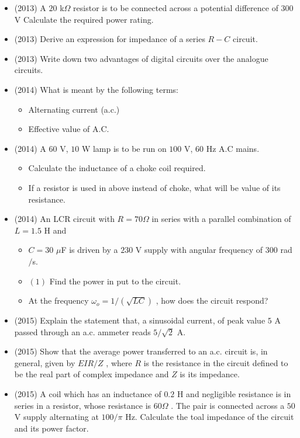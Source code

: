 \documentclass{article}
\begin{document}
\begin{itemize}
\item (2013)  A $ 20$ k$ \Omega$ resistor is to be connected across a potential difference of $ 300$ V Calculate the required power rating.
\item (2013)  Derive an expression for impedance of a series $ R-C$ circuit. 
\item (2013)  Write down two advantages of digital circuits over the analogue circuits.
\item (2014)  What is meant by the following terms:\begin{itemize}
\item Alternating current (a.c.)
\item Effective value of A.C. 
\end{itemize}
\item (2014)  A $ 60$ V, $ 10$ W lamp is to be run on $ 100$ V, $ 60$ Hz A.C mains.\begin{itemize}
\item Calculate the inductance of a choke coil required.
\item If a resistor is used in above instead of choke, what will be value of its resistance.
\end{itemize}
\item (2014)  An LCR circuit with $ R=70\Omega$ in series with a parallel combination of $ L=1.5$ H and\begin{itemize}
\item $ C=30$ $\mu$F is driven by a $ 230$ V supply with angular frequency of $ 300$ rad$/$s.
\item $ (1)$ Find the power in put to the circuit. 
\item  At the frequency $ \omega_{o}=1/(\sqrt{LC})$ , how does the circuit respond?
\end{itemize}
\item (2015)  Explain the statement that, a sinusoidal current, of peak value $ 5$ A passed through an a.c. ammeter reads $ 5/\sqrt{2}$ A.  
\item (2015)  Show that the average power transferred to an a.c. circuit is, in general, given by $ EIR/Z$ , where $ R$ is the resistance in the circuit defined to be the real part of complex impedance and $ Z$ is its impedance.
\item (2015)  A coil which has an inductance of $ 0.2$ H and negligible resistance is in series in a resistor, whose resistance is $ 60\Omega $ . The pair is connected across a $ 50$ V supply alternating at $ 100/\pi$ Hz.  Calculate the toal impedance of the circuit and its power factor.

\end{itemize}
\end{document}
